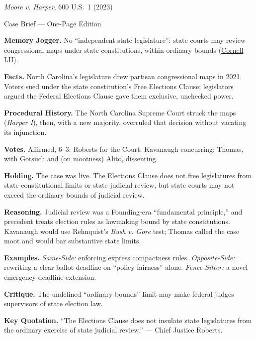 \documentclass[12pt]{article}
\begin{document}
\begin{center}
{\Large \textit{Moore v. Harper}, 600 U.S.\ 1 (2023)\par}
\vspace{0.3em}
{\normalsize Case Brief --- One-Page Edition\par}
\end{center}

\textbf{Memory Jogger.} No ``independent state legislature'': state courts may review congressional maps under state constitutions, within ordinary bounds (\href{https://www.law.cornell.edu/supremecourt/text/21-1271}{Cornell LII}).

\textbf{Facts.} North Carolina's legislature drew partisan congressional maps in 2021. Voters sued under the state constitution's Free Elections Clause; legislators argued the Federal Elections Clause gave them exclusive, unchecked power.

\textbf{Procedural History.} The North Carolina Supreme Court struck the maps (\textit{Harper I}), then, with a new majority, overruled that decision without vacating its injunction.

\textbf{Votes.} Affirmed, 6--3: Roberts for the Court; Kavanaugh concurring; Thomas, with Gorsuch and (on mootness) Alito, dissenting.

\textbf{Holding.} The case was live. The Elections Clause does not free legislatures from state constitutional limits or state judicial review, but state courts may not exceed the ordinary bounds of judicial review.

\textbf{Reasoning.} Judicial review was a Founding-era ``fundamental principle,'' and precedent treats election rules as lawmaking bound by state constitutions. Kavanaugh would use Rehnquist's \textit{Bush v. Gore} test; Thomas called the case moot and would bar substantive state limits.

\textbf{Examples.} \emph{Same-Side:} enforcing express compactness rules. \emph{Opposite-Side:} rewriting a clear ballot deadline on ``policy fairness'' alone. \emph{Fence-Sitter:} a novel emergency deadline extension.

\textbf{Critique.} The undefined ``ordinary bounds'' limit may make federal judges supervisors of state election law.

\textbf{Key Quotation.} ``The Elections Clause does not insulate state legislatures from the ordinary exercise of state judicial review.'' --- Chief Justice Roberts.
\end{document}
